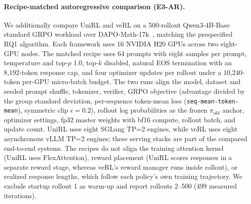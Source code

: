 \documentclass[10pt]{article}
\begin{document}
\paragraph{Recipe-matched autoregressive comparison (E3-AR).}
We additionally compare UniRL and veRL on a 500-rollout Qwen3-4B-Base~\citep{yang2025qwen3} standard GRPO workload over DAPO-Math-17k~\citep{yu2025dapo}, matching the prespecified RQ1 algorithm.
Each framework uses 16 NVIDIA H20 GPUs across two eight-GPU nodes.
The matched recipe uses 64 prompts with eight samples per prompt, temperature and top-$p$ 1.0, top-$k$ disabled, natural EOS termination with an 8,192-token response cap, and four optimizer updates per rollout under a 10,240-token per-GPU micro-batch budget.
The two runs align the model, dataset and seeded prompt shuffle, tokenizer, verifier, GRPO objective (advantage divided by the group standard deviation, per-sequence token-mean loss (\texttt{seq-mean-token-mean}), symmetric clip $\epsilon=0.2$), rollout log probabilities as the frozen $\pi_{\text{old}}$ anchor, optimizer settings, fp32 master weights with bf16 compute, rollout batch, and update count.
UniRL uses eight SGLang TP=2 engines, while veRL uses eight asynchronous vLLM TP=2 engines; these serving stacks are part of the compared end-to-end systems.
The recipes do not align the training attention kernel (UniRL uses FlexAttention), reward placement (UniRL scores responses in a separate reward stage, whereas veRL's reward manager runs inside rollout), or realized response lengths, which follow each policy's own training trajectory.
We exclude startup rollout 1 as warm-up and report rollouts 2--500 (499 measured iterations).

\begin{table}[H]
\caption{Recipe-matched Qwen3-4B-Base GRPO performance over rollouts 2--500 (one rollout per iteration step). Recipes are matched; realized response lengths and 8,192-token truncation rates are not, and the two runs executed concurrently on separate two-node H20 allocations. Times, response length, and truncation rate are mean $\pm$ step-level population standard deviation over 499 rollouts. Token rates divide total generated tokens by total measured time. Step-level deviations describe these runs and are not process-level uncertainty estimates.}
\label{tab:ar-systems}
\centering
\scriptsize
{}
\end{table}
\end{document}
